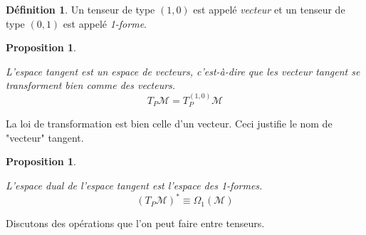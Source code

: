 \documentclass[a4paper,11pt]{report}
\theoremstyle{definition}
\theoremstyle{plain}
\newtheorem{prop}[thm]{Proposition}
\theoremstyle{definition}
\newtheorem{defn}{Définition}[chapter]
\theoremstyle{remark}
\newcommand{\M}{\mathscr{M}}
\begin{document}
                \begin{defn}
                    Un tenseur de type $(1,0)$ est appelé \textit{vecteur} et un tenseur de type $(0,1)$ est appelé \textit{1-forme}.
                \end{defn}
                
                \begin{prop}\begin{leftbar}
                    L'espace tangent est un espace de vecteurs, c'est-à-dire que les vecteur tangent se transforment bien comme des vecteurs.
                    \begin{equation}
                        T_P\M = T^{(1,0)}_P\M
                    \end{equation}
                \end{leftbar}\end{prop}
                
                La loi de transformation est bien celle d'un vecteur. Ceci justifie le nom de "vecteur" tangent.\\
                
                \begin{prop}\begin{leftbar}
                    L'espace dual de l'espace tangent est l'espace des 1-formes.
                    \begin{equation}
                        (T_P\M)^* \equiv \Omega_1(\M)
                    \end{equation}
                \end{leftbar}\end{prop}
                
                Discutons des opérations que l'on peut faire entre tenseurs.
                
\end{document}
